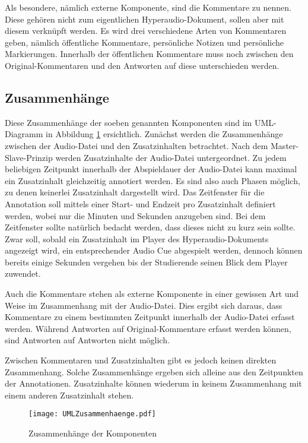 Als besondere, nämlich externe Komponente, sind die Kommentare zu nennen. Diese gehören nicht zum eigentlichen Hyperaudio-Dokument, sollen aber mit diesem verknüpft werden. Es wird drei verschiedene Arten von Kommentaren geben, nämlich  öffentliche Kommentare, persönliche Notizen und persönliche Markierungen. Innerhalb der öffentlichen Kommentare muss noch zwischen den Original-Kommentaren und den Antworten auf diese unterschieden werden. 


\subsection{Zusammenhänge}
\label{sec:komponenten_zusammenhänge}
Diese Zusammenhänge der soeben genannten Komponenten sind im UML-Diagramm in Abbildung \ref{fig:UMLAufbau} ersichtlich. Zunächst werden die Zusammenhänge zwischen der Audio-Datei und den Zusatzinhalten betrachtet. Nach dem Master-Slave-Prinzip werden Zusatzinhalte der Audio-Datei untergeordnet. Zu jedem beliebigen Zeitpunkt innerhalb der Abspieldauer der Audio-Datei kann maximal ein Zusatzinhalt gleichzeitig annotiert werden. Es sind also auch Phasen möglich, zu denen keinerlei Zusatzinhalt dargestellt wird. Das Zeitfenster für die Annotation soll mittels einer Start- und Endzeit pro Zusatzinhalt definiert werden, wobei nur die Minuten und Sekunden anzugeben sind. Bei dem Zeitfenster sollte natürlich bedacht werden, dass dieses nicht zu kurz sein sollte. Zwar soll, sobald ein Zusatzinhalt im Player des Hyperaudio-Dokuments angezeigt wird, ein entsprechender Audio Cue abgespielt werden, dennoch können bereits einige Sekunden vergehen bis der Studierende seinen Blick dem Player zuwendet.

Auch die Kommentare stehen als externe Komponente in einer gewissen Art und Weise im Zusammenhang mit der Audio-Datei. Dies ergibt sich daraus, dass Kommentare zu einem bestimmten Zeitpunkt innerhalb der Audio-Datei erfasst werden. Während Antworten auf Original-Kommentare erfasst werden können, sind Antworten auf Antworten nicht möglich.

Zwischen Kommentaren und Zusatzinhalten gibt es jedoch keinen direkten Zusammenhang. Solche Zusammenhänge ergeben sich alleine aus den Zeitpunkten der Annotationen. Zusatzinhalte können wiederum in keinem Zusammenhang mit einem anderen Zusatzinhalt stehen.


\begin{figure}[h!]
\texttt{[image: UMLZusammenhaenge.pdf]}
\caption{\label{fig:UMLAufbau}Zusammenhänge der Komponenten}
\end{figure}


